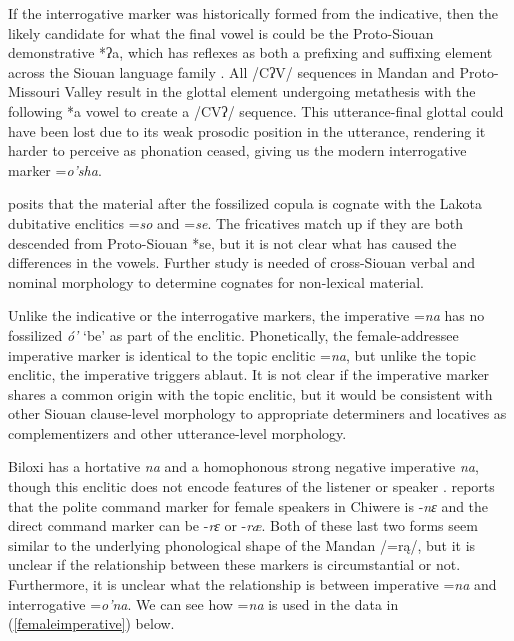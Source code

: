 If the interrogative marker was historically formed from the indicative, then the likely candidate for what the final vowel is could be the Proto-Siouan demonstrative *ʔa, which has reflexes as both a prefixing and suffixing element across the Siouan language family \citep{rankin2015}. All /CʔV/ sequences in Mandan and Proto-Missouri Valley result in the glottal element undergoing metathesis with the following *a vowel to create a /CVʔ/ sequence. This utterance-final glottal could have been lost due to its weak prosodic position in the utterance, rendering it harder to perceive as phonation ceased, giving us the modern interrogative marker =\textit{o'sha}.

\citet{rankin2010} posits that the material after the fossilized copula is cognate with the Lakota dubitative enclitics =\textit{so} and =\textit{se}. The fricatives match up if they are both descended from Proto-Siouan *se, but it is not clear what has caused the differences in the vowels. Further study is needed of cross-Siouan verbal and nominal morphology to determine cognates for non-lexical material.


Unlike the indicative or the interrogative markers, the imperative =\textit{na} has no fossilized \textit{ó'} `be' as part of the enclitic. Phonetically, the female-addressee imperative marker is identical to the topic enclitic =\textit{na}, but unlike the topic enclitic, the imperative triggers ablaut. It is not clear if the imperative marker shares a common origin with the topic enclitic, but it would be consistent with other Siouan clause-level morphology to appropriate determiners and locatives as complementizers and other utterance-level morphology.

Biloxi has a hortative \textit{na} and a homophonous strong negative imperative \textit{na}, though this enclitic does not encode features of the listener or speaker \citep[91]{einaudi1976}. \citet[222]{greer2016} reports that the polite command marker for female speakers in Chiwere is -\textit{nɛ} and the direct command marker can be -\textit{rɛ} or -\textit{r\ae}. Both of these last two forms seem similar to the underlying phonological shape of the Mandan /=rą/, but it is unclear if the relationship between these markers is circumstantial or not. Furthermore, it is unclear what the relationship is between imperative =\textit{na} and interrogative =\textit{o'na}. We can see how =\textit{na} is used in the data in (\ref{femaleimperative}) below.

